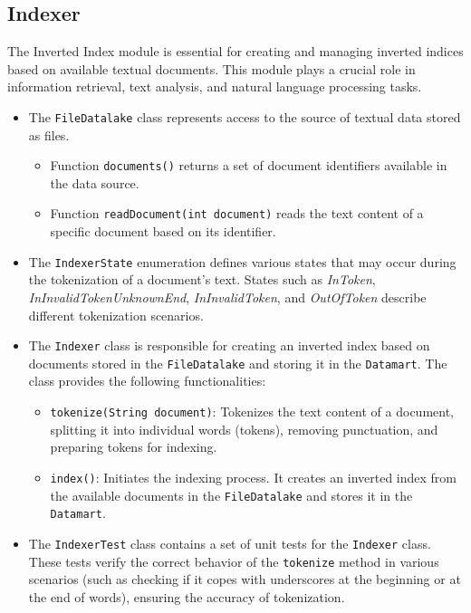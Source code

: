 \documentclass{article}
\begin{document}
\subsection{Indexer}

The Inverted Index module is essential for creating and managing inverted indices based on available textual documents. This module plays a crucial role in information retrieval, text analysis, and natural language processing tasks.

\begin{itemize}
\item
The \texttt{FileDatalake} class represents access to the source of textual data stored as files. 
\begin{itemize}
\item Function \texttt{documents()} returns a set of document identifiers available in the data source.
\item  Function \texttt{readDocument(int document)} reads the text content of a specific document based on its identifier.
\end{itemize}

\item 
The \texttt{IndexerState} enumeration defines various states that may occur during the tokenization of a document's text. States such as \textit{InToken}, \textit{InInvalidTokenUnknownEnd}, \textit{InInvalidToken}, and \textit{OutOfToken} describe different tokenization scenarios.

\item
The \texttt{Indexer} class is responsible for creating an inverted index based on documents stored in the \texttt{FileDatalake} and storing it in the \texttt{Datamart}. The class provides the following functionalities:

\begin{itemize}
  \item \texttt{tokenize(String document)}: Tokenizes the text content of a document, splitting it into individual words (tokens), removing punctuation, and preparing tokens for indexing.
  \item \texttt{index()}: Initiates the indexing process. It creates an inverted index from the available documents in the \texttt{FileDatalake} and stores it in the \texttt{Datamart}.
\end{itemize}

\item
The \texttt{IndexerTest} class contains a set of unit tests for the \texttt{Indexer} class. These tests verify the correct behavior of the \texttt{tokenize} method in various scenarios (such as checking if it copes with underscores  at the beginning or at the end of words), ensuring the accuracy of tokenization.
\end{itemize}
\end{document}
